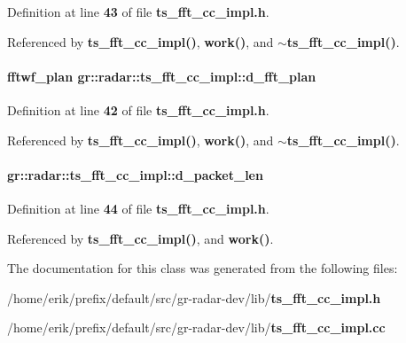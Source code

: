 Definition at line {\bf 43} of file {\bf ts\+\_\+fft\+\_\+cc\+\_\+impl.\+h}.



Referenced by {\bf ts\+\_\+fft\+\_\+cc\+\_\+impl()}, {\bf work()}, and {\bf $\sim$ts\+\_\+fft\+\_\+cc\+\_\+impl()}.

\paragraph[{d\+\_\+fft\+\_\+plan}]{\setlength{\rightskip}{0pt plus 5cm}fftwf\+\_\+plan gr\+::radar\+::ts\+\_\+fft\+\_\+cc\+\_\+impl\+::d\+\_\+fft\+\_\+plan}\label{classgr_1_1radar_1_1ts__fft__cc__impl_ae7fec68e9b1eb4f950cfd2e259f9002d}


Definition at line {\bf 42} of file {\bf ts\+\_\+fft\+\_\+cc\+\_\+impl.\+h}.



Referenced by {\bf ts\+\_\+fft\+\_\+cc\+\_\+impl()}, {\bf work()}, and {\bf $\sim$ts\+\_\+fft\+\_\+cc\+\_\+impl()}.

\paragraph[{d\+\_\+packet\+\_\+len}]{ gr\+::radar\+::ts\+\_\+fft\+\_\+cc\+\_\+impl\+::d\+\_\+packet\+\_\+len}\label{classgr_1_1radar_1_1ts__fft__cc__impl_a481af5ed62183d06c75b117cd27cd6fa}


Definition at line {\bf 44} of file {\bf ts\+\_\+fft\+\_\+cc\+\_\+impl.\+h}.



Referenced by {\bf ts\+\_\+fft\+\_\+cc\+\_\+impl()}, and {\bf work()}.



The documentation for this class was generated from the following files\+:\begin{DoxyCompactItemize}
\item 
/home/erik/prefix/default/src/gr-\/radar-\/dev/lib/{\bf ts\+\_\+fft\+\_\+cc\+\_\+impl.\+h}\item 
/home/erik/prefix/default/src/gr-\/radar-\/dev/lib/{\bf ts\+\_\+fft\+\_\+cc\+\_\+impl.\+cc}\end{DoxyCompactItemize}
